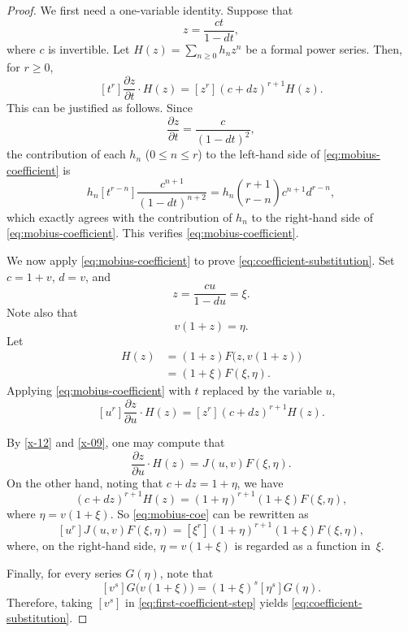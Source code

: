 \documentclass[12pt,a4paper,reqno]{amsart}
\numberwithin{equation}{section}
\theoremstyle{definition}
\theoremstyle{remark}
\begin{document}
\begin{proof}
We first need  a one-variable identity.  Suppose that
\[
 z=\frac{ct}{1-dt}, 
\]
where $c$ is invertible.  Let $H(z)=\sum_{n\geq0}h_nz^n$ be a formal power series.  Then, for
$r\geq0$,
\begin{equation}\label{eq:mobius-coefficient}
 [t^r]\frac{\partial z}{\partial t}\cdot H(z)
 =[z^r](c+dz)^{r+1}H(z).
\end{equation}
This can be justified as follows.  Since
\[
 \frac{\partial z}{\partial t}=\frac{c}{(1-dt)^2},
\]
the contribution of each $h_n$ ($0\leq n\leq r$) to the left-hand side of \eqref{eq:mobius-coefficient} is
\[
 h_n[t^{r-n}]\frac{c^{n+1}}{(1-dt)^{n+2}}
 =h_n\binom{r+1}{r-n}c^{n+1}d^{r-n},
\]
which exactly agrees with the  contribution of $h_n$ to the right-hand side  of \eqref{eq:mobius-coefficient}. 
This verifies \eqref{eq:mobius-coefficient}. 

We now apply \eqref{eq:mobius-coefficient} to prove \eqref{eq:coefficient-substitution}.
Set  $c=1+v$, $d=v$, and 
\begin{equation}\label{x-12}
     z=\frac{cu}{1-du}=\xi.
\end{equation}
Note also that 
\[
v(1+z)=\eta.
\] 
Let 
\begin{align}
     H(z)&=(1+z)F\bigl(z,v(1+z)\bigr)\nonumber\\
     &=(1+\xi)F(\xi, \eta).\label{x-09}
\end{align}
Applying 
\eqref{eq:mobius-coefficient} with $t$ replaced by the variable $u$,
\begin{equation}\label{eq:mobius-coe}
 [u^r]\frac{\partial z}{\partial u}\cdot H(z)
 =[z^r](c+dz)^{r+1}H(z).
\end{equation}

By \eqref{x-12} and \eqref{x-09}, one may compute that 
\begin{equation*}
  \frac{\partial z}{\partial u}\cdot H(z)=J(u,v) F(\xi,\eta).  
\end{equation*}
On the other hand, noting that 
  $c+dz=1+\eta$, we have
\begin{equation*}
    (c+dz)^{r+1}H(z)=(1+\eta)^{r+1}(1+\xi)F(\xi,\eta),
\end{equation*}  
{where $\eta=v(1+\xi)$}. 
So \eqref{eq:mobius-coe} can be rewritten as 
\begin{equation}\label{eq:first-coefficient-step}
 [u^r]J(u,v)F(\xi,\eta)
 =[\xi^r](1+\eta)^{r+1}(1+\xi)F(\xi,\eta),
\end{equation}
where, on the right-hand side,  $\eta=v(1+\xi)$ is regarded as a function in~$\xi$. 


Finally, for every series $G(\eta)$, note that 
\[
 [v^s]G\bigl(v(1+\xi)\bigr)
 =(1+\xi)^s[\eta^s]G(\eta).
\]
Therefore, taking $[v^s]$ in \eqref{eq:first-coefficient-step}   yields \eqref{eq:coefficient-substitution}.
\end{proof}
\end{document}

